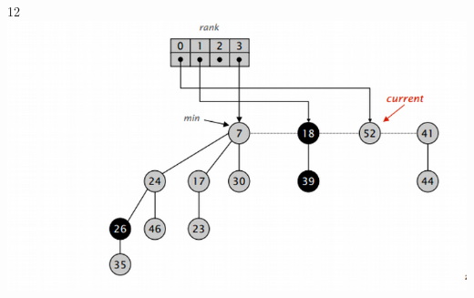 \documentclass{beamer}
\begin{document}
\begin{frame}
\begin{columns}[t]
    12
    \includegraphics[width =0.9 \textwidth]{imagenes/delete12.png}

   \end{columns}
   

\end{frame}
\end{document}
